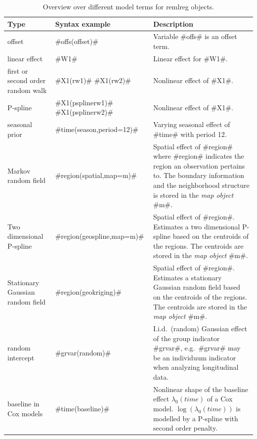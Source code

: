 \begin{table}[ht] \footnotesize
\begin{center}
\begin{tabular}{|p{2.8cm}|p{3.6cm}|p{7.1cm}|}
\hline
{\bf Type} & {\bf Syntax example} & {\bf Description} \\
\hline \hline
offset & #offs(offset)#  & Variable #offs# is an offset term. \\
\hline
linear effect & #W1#  & Linear effect for #W1#. \\
\hline
first or second order random walk &   #X1(rw1)#  \newline  #X1(rw2)#  & Nonlinear effect of #X1#. \\
\hline
P-spline &  #X1(psplinerw1)#   \newline  #X1(psplinerw2)#  & Nonlinear effect of #X1#.  \\
\hline
seasonal prior & #time(season,period=12)# & Varying seasonal effect of #time# with period 12. \\
\hline Markov random \newline field &  #region(spatial,map=m)#  &
Spatial effect of #region# where #region# indicates the region an
observation pertains to. The boundary information and the
neighborhood structure is stored in the {\em map object}
#m#. \\
\hline Two dimensional \newline P-spline &
#region(geospline,map=m)# & Spatial effect of #region#. Estimates
a two dimensional P-spline
based on the centroids of the regions. The centroids are stored in the {\em map object} #m#. \\
 \hline
 Stationary Gaussian random field & #region(geokriging)# & Spatial effect of #region#. Estimates
a stationary Gaussian random field
based on the centroids of the regions. The centroids are stored in the {\em map object} #m#. \\
\hline
 random intercept &  #grvar(random)# & I.i.d.~(random) Gaussian effect of the group indicator #grvar#,
 e.g.~#grvar# may be an individuum indicator when analyzing longitudinal data.  \\
\hline
 baseline in Cox models & #time(baseline)# & Nonlinear shape
of the baseline effect $\lambda_0(time)$ of a Cox model. $\log(\lambda_0(time))$ is modelled by a P-spline with second order penalty. \\
 \hline
\end{tabular}
{\em \caption {\label{remlregterms} Overview over different model
terms for remlreg objects.}}
\end{center}
\end{table}


